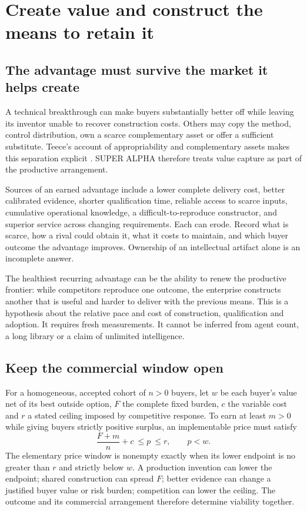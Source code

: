\documentclass[11pt,letterpaper]{article}
\begin{document}
\section{Create value and construct the means to retain it}
\subsection{The advantage must survive the market it helps create}
A technical breakthrough can make buyers substantially better off while leaving its inventor unable to recover construction costs. Others may copy the method, control distribution, own a scarce complementary asset or offer a sufficient substitute. Teece's account of appropriability and complementary assets makes this separation explicit \cite{teece}. SUPER ALPHA therefore treats value capture as part of the productive arrangement.

Sources of an earned advantage include a lower complete delivery cost, better calibrated evidence, shorter qualification time, reliable access to scarce inputs, cumulative operational knowledge, a difficult-to-reproduce constructor, and superior service across changing requirements. Each can erode. Record what is scarce, how a rival could obtain it, what it costs to maintain, and which buyer outcome the advantage improves. Ownership of an intellectual artifact alone is an incomplete answer.

The healthiest recurring advantage can be the ability to renew the productive frontier: while competitors reproduce one outcome, the enterprise constructs another that is useful and harder to deliver with the previous means. This is a hypothesis about the relative pace and cost of construction, qualification and adoption. It requires fresh measurements. It cannot be inferred from agent count, a long library or a claim of unlimited intelligence.

\subsection{Keep the commercial window open}
For a homogeneous, accepted cohort of $n>0$ buyers, let $w$ be each buyer's value net of its best outside option, $F$ the complete fixed burden, $c$ the variable cost and $r$ a stated ceiling imposed by competitive response. To earn at least $m>0$ while giving buyers strictly positive surplus, an implementable price must satisfy
\begin{equation}
\frac{F+m}{n}+c\ \le p\ \le r,\qquad p<w.
\end{equation}
The elementary price window is nonempty exactly when its lower endpoint is no greater than $r$ and strictly below $w$. A production invention can lower the endpoint; shared construction can spread $F$; better evidence can change a justified buyer value or risk burden; competition can lower the ceiling. The outcome and its commercial arrangement therefore determine viability together.
\end{document}
